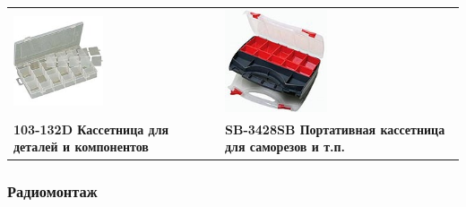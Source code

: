 \begin{tabular}{p{} p{}}
\noindent\includegraphics[width=0.45\textwidth]{tech/tools/proskit/103-132D.jpg}
&
\noindent\includegraphics[width=0.45\textwidth]{tech/tools/proskit/SB-3428SB.jpg}
\\
\textbf{103-132D Кассетница для деталей и компонентов}
&
\textbf{SB-3428SB Портативная кассетница для саморезов и т.п.}
\\
\end{tabular}
\clearpage

\subsubsection{Радиомонтаж}

